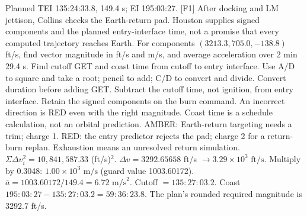 {Planned TEI 135:24:33.8, 149.4 s; EI 195:03:27. [F1]}
{After docking and LM jettison, Collins checks the Earth-return pad.
Houston supplies signed components and the planned entry-interface
time, not a promise that every computed trajectory reaches Earth.}
{For components \((3213.3,705.0,-138.8)\) ft/s, find vector magnitude
in ft/s and m/s, and average acceleration over 2 min 29.4 s.
Find cutoff GET and coast time from cutoff to entry interface.}
{Use A/D to square and take a root; pencil to add;
C/D to convert and divide. Convert duration before adding GET.
Subtract the cutoff time, not ignition, from entry interface.}
{Retain the signed components on the burn command. An incorrect
direction is RED even with the right magnitude. Coast time is a
schedule calculation, not an orbital prediction.}
{AMBER: Earth-return targeting needs a trim; charge 1.
RED: the entry predictor rejects the pad; charge 2 for a return-burn
replan. Exhaustion means an unresolved return simulation.}
{\(\Sigma \Delta v_i^2=10{,}841{,}587.33\) (ft/s)\(^{2}\).
\(\Delta v=3292.65658\) ft/s
\(\rightarrow\boxed{3.29\times10^3\text{ ft/s}}\).
Multiply by 0.3048: \(\boxed{1.00\times10^3\text{ m/s}}\)
(guard value 1003.60172).
\(\bar a=1003.60172/149.4=\boxed{6.72\text{ m/s}^2}\).
Cutoff \(=\boxed{135{:}27{:}03.2}\).
Coast \(195{:}03{:}27-135{:}27{:}03.2
=\boxed{59{:}36{:}23.8}\).
The plan's rounded required magnitude is 3292.7 ft/s.}


